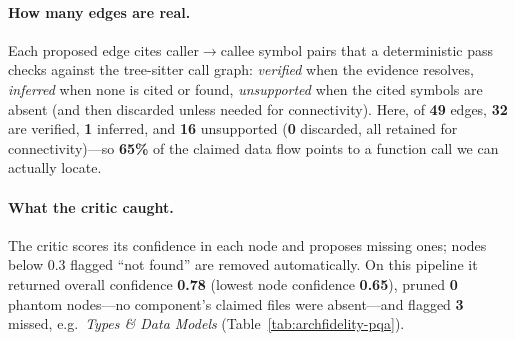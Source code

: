 \documentclass[11pt]{article}
\begin{document}
\begin{table}[t]
\centering
\setlength{\tabcolsep}{3pt}
\caption{Components Litmus recovers for the account-grouping pipeline. Roles, kinds, and silent-failure risk are emitted fields of the synthesizer schema.}
\label{tab:archgraph}
\end{table}

\paragraph{How many edges are real.}
Each proposed edge cites caller$\to$callee symbol pairs that a deterministic pass checks against the tree-sitter call graph: \emph{verified} when the evidence resolves, \emph{inferred} when none is cited or found, \emph{unsupported} when the cited symbols are absent (and then discarded unless needed for connectivity). Here, of \textbf{49} edges, \textbf{32} are verified, \textbf{1} inferred, and \textbf{16} unsupported (\textbf{0} discarded, all retained for connectivity)---so \textbf{65\%} of the claimed data flow points to a function call we can actually locate.

\paragraph{What the critic caught.}
The critic scores its confidence in each node and proposes missing ones; nodes below $0.3$ flagged ``not found'' are removed automatically. On this pipeline it returned overall confidence \textbf{0.78} (lowest node confidence \textbf{0.65}), pruned \textbf{0} phantom nodes---no component's claimed files were absent---and flagged \textbf{3} missed, e.g.\ \emph{Types \& Data Models} (Table~\ref{tab:archfidelity-pqa}).
\end{document}
